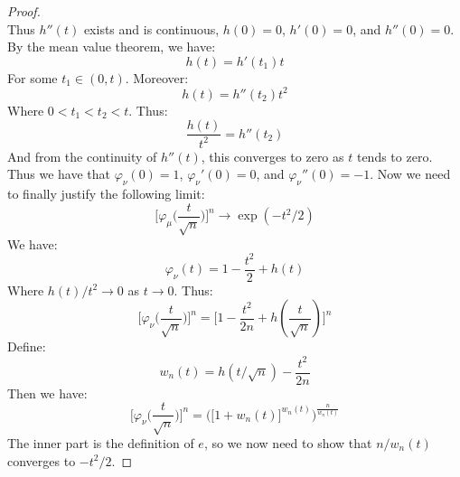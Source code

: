 \begin{proof}
\begin{equation}
            \end{equation}
            Thus $h''(t)$ exists and is continuous,
            $h(0)=0$, $h'(0)=0$, and $h''(0)=0$. By the
            mean value theorem, we have:
            \begin{equation}
                h(t)=h'(t_{1})t
            \end{equation}
            For some $t_{1}\in(0,t)$. Moreover:
            \begin{equation}
                h(t)=h''(t_{2})t^{2}
            \end{equation}
            Where $0<t_{1}<t_{2}<t$. Thus:
            \begin{equation}
                \frac{h(t)}{t^{2}}=h''(t_{2})
            \end{equation}
            And from the continuity of $h''(t)$, this
            converges to zero as $t$ tends to zero. Thus
            we have that $\varphi_{\nu}(0)=1$,
            $\varphi_{\nu}'(0)=0$, and
            $\varphi_{\nu}''(0)=\minus{1}$. Now we need to 
            finally justify the following limit:
            \begin{equation}
                \Big[\varphi_{\mu}\big(\frac{t}{\sqrt{n}}\big)
                    \Big]^{n}\rightarrow\exp(\minus{t}^{2}/2)
            \end{equation}
            We have:
            \begin{equation}
                \varphi_{\nu}(t)=1-\frac{t^{2}}{2}+h(t)
            \end{equation}
            Where $h(t)/t^{2}\rightarrow{0}$ as
            $t\rightarrow{0}$. Thus:
            \begin{equation}
                \Big[\varphi_{\nu}\big(\frac{t}{\sqrt{n}}
                    \big)\Big]^{n}=
                \Big[1-\frac{t^{2}}{2n}+h(\frac{t}{\sqrt{n}})
                    \Big]^{n}
            \end{equation}
            Define:
            \begin{equation}
                w_{n}(t)=h(t/\sqrt{n})-\frac{t^{2}}{2n}
            \end{equation}
            Then we have:
            \begin{equation}
                \Big[\varphi_{\nu}\big(\frac{t}{\sqrt{n}}
                    \big)\Big]^{n}
                =\Big(\Big[1+w_{n}(t)\Big]^{w_{n}(t)}
                    \Big)^{\frac{n}{w_{n}(t)}}
            \end{equation}
            The inner part is the definition of $e$, so we
            now need to show that $n/w_{n}(t)$ converges to
            $\minus{t}^{2}/2$.
        \end{proof}